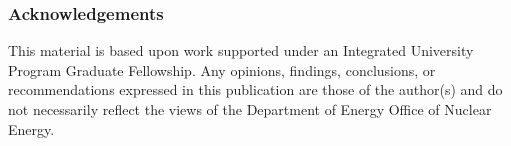\begin{frame}
    \frametitle{Acknowledgements}
    This material is based upon work supported under an Integrated University 
Program Graduate Fellowship. Any opinions, findings, conclusions, or 
recommendations expressed in this publication are those of the author(s) 
and do not necessarily reflect the views of the Department of Energy Office 
of Nuclear Energy.

\end{frame}